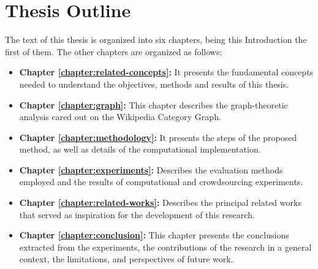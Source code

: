 \section{\hspace*{3pt}Thesis Outline}

The text of this thesis is organized into six chapters, being this Introduction the first of them. The other chapters are organized as follows:

\begin{itemize}
\item\textbf {Chapter \ref{chapter:related-concepts}:} It presents the fundamental concepts needed to understand the objectives, methods and results of this thesis.

\item \textbf {Chapter \ref{chapter:graph}:} This chapter describes the graph-theoretic analysis cared out on the Wikipedia Category Graph.

\item \textbf {Chapter \ref{chapter:methodology}:} It presents the steps of the proposed method, as well as details of the computational implementation.

\item \textbf {Chapter \ref{chapter:experiments}:} Describes the evaluation methods employed and the results of computational and crowdsourcing experiments.

\item \textbf {Chapter \ref{chapter:related-works}:} Describes the principal related works that served as inspiration for the development of this research.

\item \textbf {Chapter \ref{chapter:conclusion}:} This chapter presents the conclusions extracted from the experiments, the contributions of the research in a general context, the limitations, and perspectives of future work.

\end{itemize}
